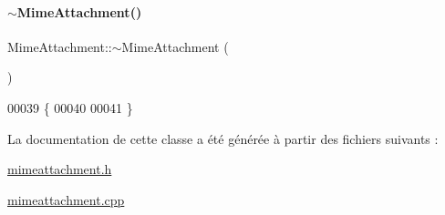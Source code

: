 \paragraph{\texorpdfstring{$\sim$\+Mime\+Attachment()}{~MimeAttachment()}}
{\footnotesize\ttfamily Mime\+Attachment\+::$\sim$\+Mime\+Attachment (\begin{DoxyParamCaption}{ }\end{DoxyParamCaption})\hspace{0.3cm}{\ttfamily [virtual]}}


\begin{DoxyCode}
00039 \{
00040 
00041 \}
\end{DoxyCode}


La documentation de cette classe a été générée à partir des fichiers suivants \+:\begin{DoxyCompactItemize}
\item 
\hyperlink{mimeattachment_8h}{mimeattachment.\+h}\item 
\hyperlink{mimeattachment_8cpp}{mimeattachment.\+cpp}\end{DoxyCompactItemize}
